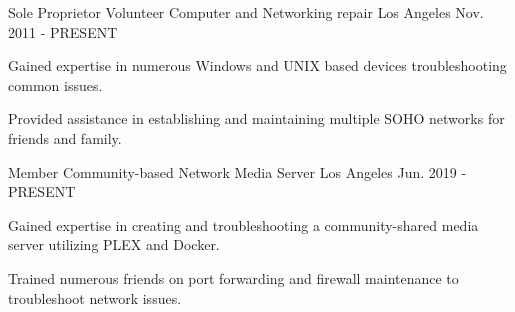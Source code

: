 


\begin{cventries}


\cventry
{Sole Proprietor} %
{Volunteer Computer and Networking repair} %
{Los Angeles} %
{Nov. 2011 - PRESENT} %
{ %
\begin{cvitems}
\item {Gained expertise in numerous Windows and UNIX based devices troubleshooting common issues.}
\item {Provided assistance in establishing and maintaining multiple SOHO networks for friends and family.}
\end{cvitems}
}


\cventry
{Member} %
{Community-based Network Media Server} %
{Los Angeles} %
{Jun. 2019 - PRESENT} %
{ %
\begin{cvitems}
\item {Gained expertise in creating and troubleshooting a community-shared media server utilizing PLEX and Docker.}
\item {Trained numerous friends on port forwarding and firewall maintenance to troubleshoot network issues.}
\end{cvitems}
}


\end{cventries}